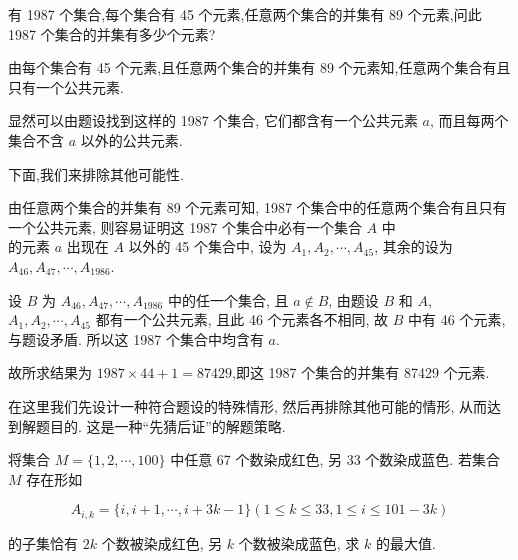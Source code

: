 \begin{example}
	有 1987 个集合,每个集合有 45 个元素,任意两个集合的并集有 89 个元素,问此 1987 个集合的并集有多少个元素?
\end{example}

\begin{analysis}
	由每个集合有 45 个元素,且任意两个集合的并集有 89 个元素知,任意两个集合有且只有一个公共元素.
\end{analysis}

\begin{solution}
	显然可以由题设找到这样的 1987 个集合, 它们都含有一个公共元素 $a$, 而且每两个集合不含 $a$ 以外的公共元素.

	下面,我们来排除其他可能性.

	由任意两个集合的并集有 89 个元素可知, 1987 个集合中的任意两个集合有且只有一个公共元素, 则容易证明这 1987 个集合中必有一个集合 $A$ 中\\
	的元素 $a$ 出现在 $A$ 以外的 45 个集合中, 设为 $A_{1}, A_{2}, \cdots, A_{45}$, 其余的设为 $A_{46}, A_{47}, \cdots, A_{1986}$.

	设 $B$ 为 $A_{46}, A_{47}, \cdots, A_{1986}$ 中的任一个集合, 且 $a \notin B$, 由题设 $B$ 和 $A$, $A_{1}, A_{2}, \cdots, A_{45}$ 都有一个公共元素, 且此 46 个元素各不相同, 故 $B$ 中有 46 个元素,与题设矛盾. 所以这 1987 个集合中均含有 $a$.

	故所求结果为 $1987 \times 44+1=87429$,即这 1987 个集合的并集有 87429 个元素.
\end{solution}

\begin{note}
	在这里我们先设计一种符合题设的特殊情形, 然后再排除其他可能的情形, 从而达到解题目的. 这是一种“先猜后证”的解题策略.
\end{note}

\begin{example}
	将集合 $M=\{1,2, \cdots, 100\}$ 中任意 67 个数染成红色, 另 33 个数染成蓝色. 若集合 $M$ 存在形如

	$$
		A_{i, k}=\{i, i+1, \cdots, i+3 k-1\}(1 \leqslant k \leqslant 33,1 \leqslant i \leqslant 101-3 k)
	$$

	的子集恰有 $2 k$ 个数被染成红色, 另 $k$ 个数被染成蓝色, 求 $k$ 的最大值.
\end{example}

